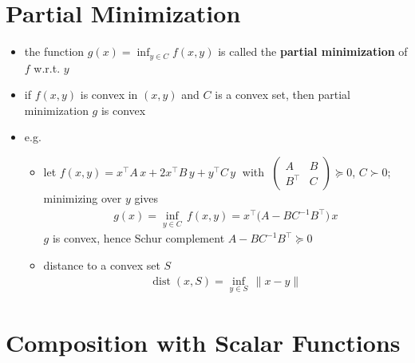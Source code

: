 \documentclass[11pt]{extarticle}
\newcommand{\ds}{\displaystyle}
\DeclareMathOperator*{\dist}{dist}
\theoremstyle{definition}
\begin{document}
\newpage

\section*{Partial Minimization}

\begin{itemize}
  \item the function $\ds g(x) = \inf_{y\in C} f(x, y)$ is called the {\bf partial minimization} of $f$ w.r.t. $y$
  \item if $f(x, y)$ is convex in $(x, y)$ and $C$ is a convex set, then partial minimization $g$ is convex
  \item e.g.
    \begin{itemize}
      \item let $f(x, y) = x^\top A\,x + 2 x^\top B\,y + y^\top C\,y\;$ with $\ds\;\begin{pmatrix}A & B \\ B^\top & C\end{pmatrix}\succcurlyeq 0$, $C\succ 0$; minimizing over $y$ gives 
        \begin{align*}
          g(x) = \inf_{y\in C}\,f(x, y) = x^\top\big(A - BC^{-1}B^\top\big)\,x
        \end{align*}
        $g$ is convex, hence Schur complement $A - BC^{-1}B^\top\succcurlyeq 0$
      \item distance to a convex set $S$
        \begin{align*}
          \dist(x, S) = \inf_{y\in S}\,\|x - y\|
        \end{align*}
    \end{itemize}
\end{itemize}

\newpage

\section*{Composition with Scalar Functions}
\end{document}
